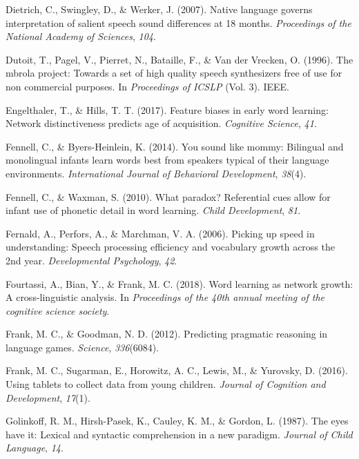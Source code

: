 \documentclass[english,,man,floatsintext]{apa6}
\theoremstyle{definition}
\theoremstyle{definition}
\theoremstyle{definition}
\theoremstyle{remark}
\begin{document}
\hypertarget{ref-dietrich2007}{}
Dietrich, C., Swingley, D., \& Werker, J. (2007). Native language
governs interpretation of salient speech sound differences at 18 months.
\emph{Proceedings of the National Academy of Sciences}, \emph{104}.

\hypertarget{ref-dutoit1996}{}
Dutoit, T., Pagel, V., Pierret, N., Bataille, F., \& Van der Vrecken, O.
(1996). The mbrola project: Towards a set of high quality speech
synthesizers free of use for non commercial purposes. In
\emph{Proceedings of ICSLP} (Vol. 3). IEEE.

\hypertarget{ref-engelthaler2017}{}
Engelthaler, T., \& Hills, T. T. (2017). Feature biases in early word
learning: Network distinctiveness predicts age of acquisition.
\emph{Cognitive Science}, \emph{41}.

\hypertarget{ref-Fennell2014}{}
Fennell, C., \& Byers-Heinlein, K. (2014). You sound like mommy:
Bilingual and monolingual infants learn words best from speakers typical
of their language environments. \emph{International Journal of
Behavioral Development}, \emph{38}(4).

\hypertarget{ref-fennell2010}{}
Fennell, C., \& Waxman, S. (2010). What paradox? Referential cues allow
for infant use of phonetic detail in word learning. \emph{Child
Development}, \emph{81}.

\hypertarget{ref-fernald2006}{}
Fernald, A., Perfors, A., \& Marchman, V. A. (2006). Picking up speed in
understanding: Speech processing efficiency and vocabulary growth across
the 2nd year. \emph{Developmental Psychology}, \emph{42}.

\hypertarget{ref-fourtassi2018}{}
Fourtassi, A., Bian, Y., \& Frank, M. C. (2018). Word learning as
network growth: A cross-linguistic analysis. In \emph{Proceedings of the
40th annual meeting of the cognitive science society}.

\hypertarget{ref-frank2012}{}
Frank, M. C., \& Goodman, N. D. (2012). Predicting pragmatic reasoning
in language games. \emph{Science}, \emph{336}(6084).

\hypertarget{ref-frank2016}{}
Frank, M. C., Sugarman, E., Horowitz, A. C., Lewis, M., \& Yurovsky, D.
(2016). Using tablets to collect data from young children. \emph{Journal
of Cognition and Development}, \emph{17}(1).

\hypertarget{ref-golinkoff1987}{}
Golinkoff, R. M., Hirsh-Pasek, K., Cauley, K. M., \& Gordon, L. (1987).
The eyes have it: Lexical and syntactic comprehension in a new paradigm.
\emph{Journal of Child Language}, \emph{14}.
\end{document}

